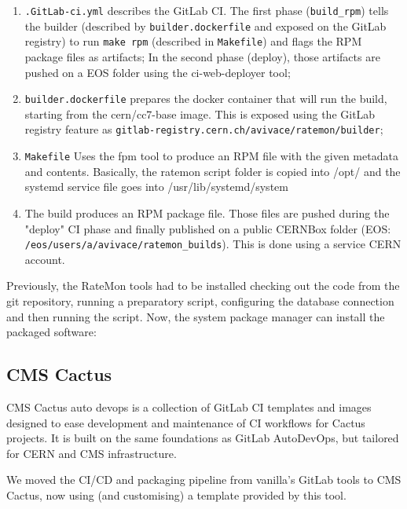 \begin{enumerate}
    \item \texttt{.GitLab-ci.yml} describes the GitLab CI. The first phase (\texttt{build\_rpm}) tells the builder (described by \texttt{builder.dockerfile} and exposed on the GitLab registry) to run \texttt{make rpm} (described in \texttt{Makefile}) and flags the RPM package files as artifacts; In the second phase (deploy), those artifacts are pushed on a EOS folder using the ci-web-deployer tool;
    \item \texttt{builder.dockerfile} prepares the docker container that will run the build, starting from the cern/cc7-base image. This is exposed using the GitLab registry feature as \texttt{gitlab-registry.cern.ch/avivace/ratemon/builder};
    \item \texttt{Makefile} Uses the fpm tool to produce an RPM file with the given metadata and contents. Basically, the ratemon script folder is copied into /opt/ and the systemd service file goes into /usr/lib/systemd/system
    \item The build produces an RPM package file. Those files are pushed during the "deploy" CI phase and finally published on a public CERNBox folder (EOS: \texttt{/eos/users/a/avivace/ratemon\_builds}). This is done using a service CERN account.
\end{enumerate}

Previously, the RateMon tools had to be installed checking out the code from the git repository, running a preparatory script, configuring the database connection and then running the script. Now, the system package manager can install the packaged software:


\subsection{CMS Cactus}

CMS Cactus auto devops \cite{DirkxCactus} is a collection of GitLab CI templates and images designed to ease development and maintenance of CI workflows for Cactus projects. It is built on the same foundations as GitLab AutoDevOps, but tailored for CERN and CMS infrastructure.

We moved the CI/CD and packaging pipeline from vanilla’s GitLab tools to CMS Cactus, now using (and customising) a template provided by this tool.

